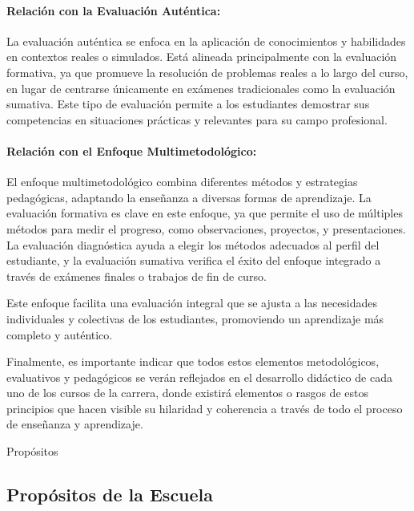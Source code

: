 \paragraph{Relación con la Evaluación Auténtica:}

La evaluación auténtica se enfoca en la aplicación de conocimientos y habilidades en contextos reales o simulados. Está alineada principalmente con la evaluación formativa, ya que promueve la resolución de problemas reales a lo largo del curso, en lugar de centrarse únicamente en exámenes tradicionales como la evaluación sumativa. Este tipo de evaluación permite a los estudiantes demostrar sus competencias en situaciones prácticas y relevantes para su campo profesional.\par

\paragraph{Relación con el Enfoque Multimetodológico:}

El enfoque multimetodológico combina diferentes métodos y estrategias pedagógicas, adaptando la enseñanza a diversas formas de aprendizaje. La evaluación formativa es clave en este enfoque, ya que permite el uso de múltiples métodos para medir el progreso, como observaciones, proyectos, y presentaciones. La evaluación diagnóstica ayuda a elegir los métodos adecuados al perfil del estudiante, y la evaluación sumativa verifica el éxito del enfoque integrado a través de exámenes finales o trabajos de fin de curso.\par

Este enfoque facilita una evaluación integral que se ajusta a las necesidades individuales y colectivas de los estudiantes, promoviendo un aprendizaje más completo y auténtico.\par

Finalmente, es importante indicar que todos estos elementos metodológicos, evaluativos y pedagógicos se verán reflejados en el desarrollo didáctico de cada uno de los cursos de la carrera, donde existirá elementos o rasgos de estos principios que hacen visible su hilaridad y coherencia a través de todo el proceso de enseñanza y aprendizaje.\par

Propósitos\par

\subsection*{Propósitos de la Escuela}

